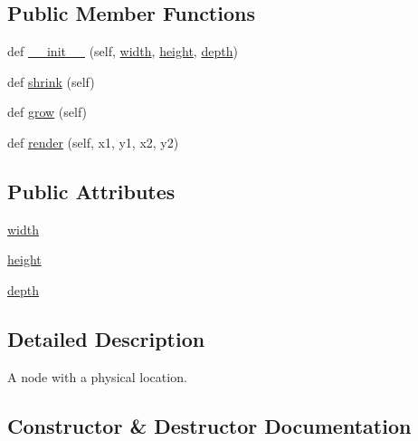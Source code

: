 \subsection*{Public Member Functions}
\begin{DoxyCompactItemize}
\item 
def \hyperlink{classmatplotlib_1_1__mathtext_1_1Box_a513c192a4773be1dab63315fe5149945}{\+\_\+\+\_\+init\+\_\+\+\_\+} (self, \hyperlink{classmatplotlib_1_1__mathtext_1_1Box_ae1a5ebb887d52c6e1da379a2265d04cb}{width}, \hyperlink{classmatplotlib_1_1__mathtext_1_1Box_a1cf957faa63df8993e57d9bcc8f1ef0f}{height}, \hyperlink{classmatplotlib_1_1__mathtext_1_1Box_aec283c7293e1d387b79c21c905a27afe}{depth})
\item 
def \hyperlink{classmatplotlib_1_1__mathtext_1_1Box_a304f3cb63eec58875dac5190d6b7f2c3}{shrink} (self)
\item 
def \hyperlink{classmatplotlib_1_1__mathtext_1_1Box_a01709908879fcc7848cbbf720278bb5f}{grow} (self)
\item 
def \hyperlink{classmatplotlib_1_1__mathtext_1_1Box_a32b41fabb550d033c449b83ed098e174}{render} (self, x1, y1, x2, y2)
\end{DoxyCompactItemize}
\subsection*{Public Attributes}
\begin{DoxyCompactItemize}
\item 
\hyperlink{classmatplotlib_1_1__mathtext_1_1Box_ae1a5ebb887d52c6e1da379a2265d04cb}{width}
\item 
\hyperlink{classmatplotlib_1_1__mathtext_1_1Box_a1cf957faa63df8993e57d9bcc8f1ef0f}{height}
\item 
\hyperlink{classmatplotlib_1_1__mathtext_1_1Box_aec283c7293e1d387b79c21c905a27afe}{depth}
\end{DoxyCompactItemize}


\subsection{Detailed Description}
\begin{DoxyVerb}A node with a physical location.\end{DoxyVerb}
 

\subsection{Constructor \& Destructor Documentation}
\mbox{\label{classmatplotlib_1_1__mathtext_1_1Box_a513c192a4773be1dab63315fe5149945}} 
